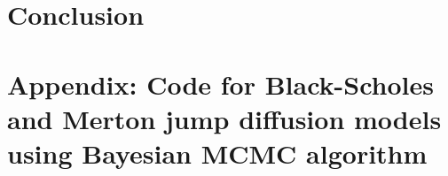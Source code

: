 \documentclass[11pt,reqno,final]{amsart}
\begin{document}
\section{Conclusion}



%
%
\newpage


%
%
\newpage
\section*{Appendix: Code for Black-Scholes and Merton jump diffusion models using Bayesian MCMC algorithm}

\end{document}
